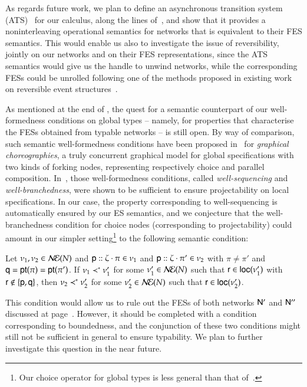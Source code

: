 As regards future work, we plan to define an asynchronous
transition system (ATS)~\cite{Bed88} for our calculus, along the lines
of~\cite{BC94}, and show that it provides a noninterleaving
operational semantics for networks that is equivalent to their FES
semantics. This would enable us also to investigate the issue of
reversibility, jointly on our networks and on their FES
representations, since the ATS semantics would give us the handle to
unwind networks, while the corresponding FESs could be unrolled
following one of the methods proposed in existing work on reversible
event structures~\cite{PU2016,CKV16,GPY19,GPY21,Gra21}.

As mentioned at the end of , the quest
for a semantic counterpart of our well-formedness conditions on global
types -- namely, for properties that characterise the FESs obtained
from typable networks -- is still open.  By way of comparison, such
semantic well-formedness conditions have been proposed in~\cite{TuostoG18} for
\emph{graphical choreographies}, a truly concurrent
graphical model for global specifications with two kinds of forking
nodes, representing respectively choice and parallel
composition. In~\cite{TuostoG18}, those well-formedness conditions, called
\emph{well-sequencing} and \emph{well-branchedness}, were shown to be
sufficient to ensure projectability on local specifications. In our
case, the property corresponding to well-sequencing is automatically
ensured by our ES semantics, and we conjecture that the well-branchedness
condition for choice nodes (corresponding to projectability) could amount in our
simpler setting\footnote{Our choice operator for global types is less
general than that of~\cite{TuostoG18}.} to the following semantic
condition:

Let $\nu_1, \nu_2\in \mathcal{N\!E}(N)$ and ${\sf p}:: \zeta\cdot\pi\in\nu_1$
and ${\sf p}:: \zeta\cdot\pi'\in\nu_2$ with
$\pi\neq\pi'$ and 
${\sf q} = {\sf pt}(\pi)={\sf pt}(\pi')$.
If $\nu_1\prec^*\nu'_1$ for some $\nu'_1\in \mathcal{N\!E}(N)$
such that ${\sf r}\in{\sf loc}(\nu'_1)$ with ${\sf r}\not\in \{{\sf p}, {\sf q}\}$, then
$\nu_2\prec^*\nu'_2$ for some $\nu'_2\in \mathcal{N\!E}(N)$ such that
${\sf r}\in{\sf loc}(\nu'_2)$.

This condition would allow us to rule out the FESs of both networks
${\sf N}'$ and ${\sf N}''$ discussed at page~\pageref{wf-discussion}. However,
it should be completed with a condition corresponding to boundedness, and the
conjunction of these two conditions might still not be sufficient in general to ensure typability.
We plan to further investigate this question in the near future.







